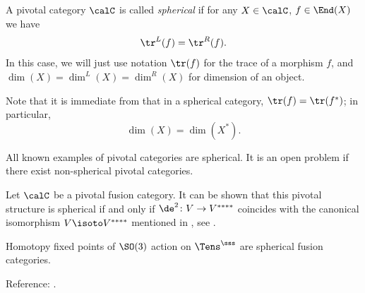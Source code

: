 \begin{definition}\label{d:spherical}
  A pivotal category $\calC$ is called
  \emph{spherical}
  if for any $X\in \calC$, $f\in \End(X)$ we have
  $$
  \tr^L(f)=\tr^R(f).
  $$
  In this case, we will just use notation $\tr(f)$ for the trace of a morphism
  $f$, and $\dim(X)=\dim^L(X)=\dim^R(X)$ for dimension of an object.
\end{definition}

Note that it is immediate from  that in a
spherical category, $\tr(f)=\tr(f^*)$; in particular,
\begin{equation}
 \dim (X)=\dim(X^*).
\end{equation}

\begin{remark}
  All known examples of pivotal categories are spherical. It is an open problem
  if there exist non-spherical pivotal categories.
\end{remark}

\begin{remark}
  Let $\calC$ be a pivotal fusion category. It can be shown that this
  pivotal structure is spherical if and only if $\de^2\colon V\to V^{****}$
  coincides with the canonical isomorphism $V\isoto V^{****}$ mentioned in
  , see \cite[Proposition 3.5.4]{dsps-dualizable}.
\end{remark}

\begin{conjecture}
  Homotopy fixed points of $\SO(3)$ action on $\Tens^\sss$ are spherical fusion
  categories.
\end{conjecture}
Reference: \cite[Conjecture 3.5.10]{dsps-dualizable}.